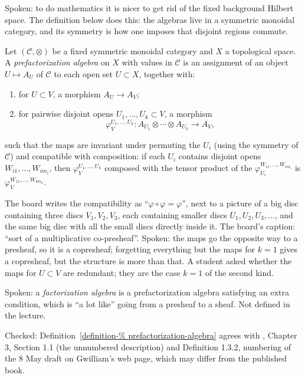 Spoken: to do mathematics it is nicer to
get rid of the fixed background Hilbert
space. The definition below does this: the
algebras live in a symmetric monoidal
category, and its symmetry is how one
imposes that disjoint regions commute.

\begin{definition}
\label{definition-prefactorization-algebra}
Let $(\mathcal{C},\otimes)$ be a fixed
symmetric monoidal category and $X$ a
topological space. A
\textit{prefactorization algebra} on $X$
with values in $\mathcal{C}$ is an
assignment of an object
$U\mapsto A_U$ of $\mathcal{C}$ to each open
set $U\subset X$, together with:
\begin{enumerate}
\item for $U\subset V$, a morphism
$A_U\to A_V$;
\item for pairwise disjoint opens
$U_1,\ldots,U_k\subset V$, a morphism
$$
\varphi^{U_1,\ldots,U_k}_V\colon
A_{U_1}\otimes\cdots\otimes A_{U_k}
\to A_V,
$$
\end{enumerate}
such that the maps are invariant under
permuting the $U_i$ (using the symmetry of
$\mathcal{C}$) and compatible with
composition: if each $U_i$ contains disjoint
opens $W_{i1},\ldots,W_{im_i}$, then
$\varphi^{U_1,\ldots,U_k}_V$ composed with
the tensor product of the
$\varphi^{W_{i1},\ldots,W_{im_i}}_{U_i}$ is
$\varphi^{W_{11},\ldots,W_{km_k}}_V$.
\end{definition}

\noindent
The board writes the compatibility as
``$\varphi\circ\varphi=\varphi$'', next to a
picture of a big disc containing three discs
$V_1,V_2,V_3$, each containing smaller
discs $U_1,U_2,U_3,\ldots$, and the same big
disc with all the small discs directly
inside it. The board's caption: ``sort of a
multiplicative co-presheaf''. Spoken: the
maps go the opposite way to a presheaf, so
it is a copresheaf; forgetting everything
but the maps for $k=1$ gives a copresheaf,
but the structure is more than that. A
student asked whether the maps for
$U\subset V$ are redundant; they are the
case $k=1$ of the second kind.

Spoken: a \textit{factorization algebra} is
a prefactorization algebra satisfying an
extra condition, which is ``a lot like''
going from a presheaf to a sheaf. Not
defined in the lecture.

Checked:
Definition~\ref{definition-%
prefactorization-algebra}
agrees with \cite{CostelloGwilliam2017},
Chapter 3, Section 1.1 (the unnumbered
description) and Definition 1.3.2,
numbering of the 8 May draft on Gwilliam's
web page, which may differ from the
published book.

